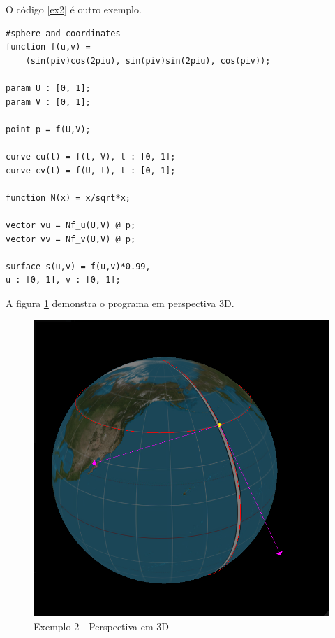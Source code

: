 O código \ref{ex2} é outro exemplo.
\begin{lstlisting}[caption=Exemplo de objetos,label=ex2]
#sphere and coordinates
function f(u,v) = 
    (sin(piv)cos(2piu), sin(piv)sin(2piu), cos(piv));

param U : [0, 1];
param V : [0, 1];

point p = f(U,V);

curve cu(t) = f(t, V), t : [0, 1];
curve cv(t) = f(U, t), t : [0, 1];

function N(x) = x/sqrt*x;

vector vu = Nf_u(U,V) @ p;
vector vv = Nf_v(U,V) @ p;

surface s(u,v) = f(u,v)*0.99, 
u : [0, 1], v : [0, 1];
\end{lstlisting}


A figura \ref{img:ex2} demonstra o programa em perspectiva 3D.
\begin{figure}[h!]
    \includegraphics[width=\linewidth]{ex2.png}
    \caption{Exemplo 2 - Perspectiva em 3D}
    \label{img:ex2}
\end{figure}


